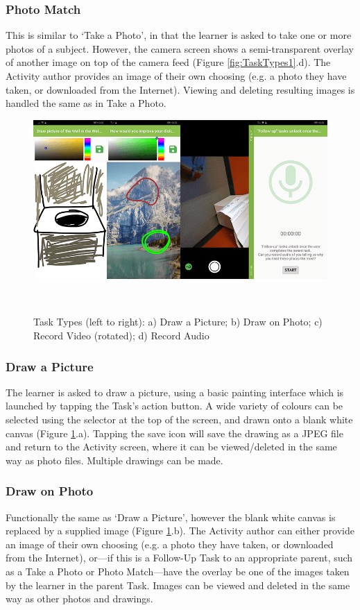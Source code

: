 \subsubsection*{Photo Match}
This is similar to `Take a Photo', in that the learner is asked to take one or more photos of a subject. However, the camera screen shows a semi-transparent overlay of another image on top of the camera feed (Figure \ref{fig:TaskTypes1}.d). The Activity author provides an image of their own choosing (e.g. a photo they have taken, or downloaded from the Internet). Viewing and deleting resulting images is handled the same as in Take a Photo.

\begin{figure}
  \centering
  \includegraphics[width=1\columnwidth]{images/chapter05/tasktypes2.png}
  \caption[Task Types (part 2)]{Task Types (left to right): a) Draw a Picture; b) Draw on Photo; c) Record Video (rotated); d) Record Audio}~\label{fig:TaskTypes2}
\end{figure}

\subsubsection*{Draw a Picture}
The learner is asked to draw a picture, using a basic painting interface which is launched by tapping the Task's action button. A wide variety of colours can be selected using the selector at the top of the screen, and drawn onto a blank white canvas (Figure \ref{fig:TaskTypes2}.a). Tapping the save icon will save the drawing as a JPEG file and return to the Activity screen, where it can be viewed/deleted in the same way as photo files. Multiple drawings can be made.

\subsubsection*{Draw on Photo}
Functionally the same as `Draw a Picture', however the blank white canvas is replaced by a supplied image (Figure \ref{fig:TaskTypes2}.b). The Activity author can either provide an image of their own choosing (e.g. a photo they have taken, or downloaded from the Internet), or---if this is a Follow-Up Task to an appropriate parent, such as a Take a Photo or Photo Match---have the overlay be one of the images taken by the learner in the parent Task. Images can be viewed and deleted in the same way as other photos and drawings.

